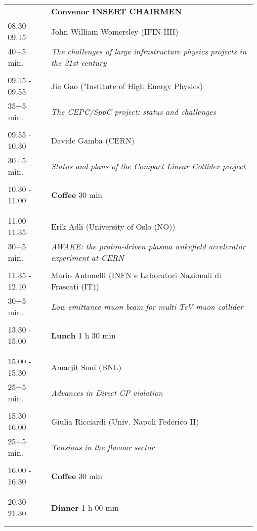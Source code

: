 \begin{longtable}{p{3cm}p{13cm}}
&\hfill {\bf Convenor INSERT CHAIRMEN }\\ 
08.30 - 09.15 & John William Womersley (IFIN-HH)\\ 
40+5 min. & {\it The challenges of large infrastructure physics projects in the 21st century}\\ 
 & \\ 
09.15 - 09.55 & Jie Gao ("Institute of High Energy Physics)\\ 
35+5 min. & {\it The CEPC/SppC project: status and challenges}\\ 
 & \\ 
09.55 - 10.30 & Davide Gamba (CERN)\\ 
30+5 min. & {\it Status and plans of the Compact Linear Collider project}\\ 
 & \\ 
10.30 - 11.00 & {\bf Coffee} \hfill 30 min \\ 
 & \\ 
 & \\ 
11.00 - 11.35 & Erik Adli (University of Oslo (NO))\\ 
30+5 min. & {\it AWAKE: the proton-driven plasma wakefield accelerator experiment at CERN}\\ 
 & \\ 
11.35 - 12.10 & Mario Antonelli (INFN e Laboratori Nazionali di  Frascati (IT))\\ 
30+5 min. & {\it Low emittance muon beam for multi-TeV muon collider}\\ 
 & \\ 
13.30 - 15.00 & {\bf Lunch} \hfill 1 h 30 min \\ 
 & \\ 
 & \\ 
15.00 - 15.30 & Amarjit Soni (BNL)\\ 
25+5 min. & {\it Advances in Direct CP violation}\\ 
 & \\ 
15.30 - 16.00 & Giulia Ricciardi (Univ. Napoli Federico II)\\ 
25+5 min. & {\it Tensions in the flavour sector}\\ 
 & \\ 
16.00 - 16.30 & {\bf Coffee} \hfill 30 min \\ 
 & \\ 
 & \\ 
20.30 - 21.30 & {\bf Dinner} \hfill 1 h 00 min \\ 
 & \\ 
 & \\ 
\end{longtable}

